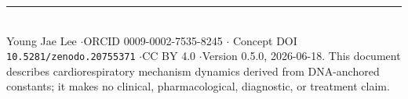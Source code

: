 \documentclass[11pt]{article}
\newcommand{\doi}{10.5281/zenodo.20755371}
\begin{document}
\bigskip
\noindent\rule{\linewidth}{0.4pt}\\
\footnotesize Young Jae Lee \quad$\cdot$\quad ORCID 0009-0002-7535-8245 \quad$\cdot$\quad
Concept DOI \texttt{\doi} \quad$\cdot$\quad CC BY 4.0 \quad$\cdot$\quad Version 0.5.0, 2026-06-18.
This document describes cardiorespiratory mechanism dynamics derived from DNA-anchored constants; it
makes no clinical, pharmacological, diagnostic, or treatment claim.
\end{document}
